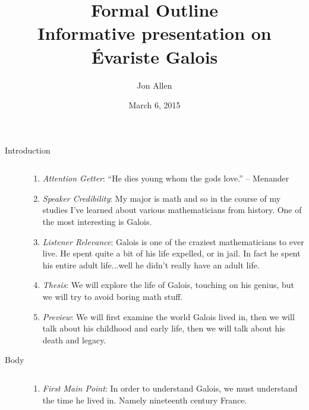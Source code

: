 \documentclass[letterpaper]{article}
\begin{document}
\title{Formal Outline\\ Informative presentation on Évariste Galois}
\date{March 6, 2015}
\author{Jon Allen}
\maketitle
\renewcommand{\labelenumi}{\Roman{enumi}}
\renewcommand{\labelenumii}{\Alph{enumii}.}

\begin{description}
\item[Introduction]$\quad$

  \begin{enumerate}
  \item
  \emph{Attention Getter}: ``He dies young whom the gods love.'' -- Menander
  \item
  \emph{Speaker Credibility}:
  My major is math and so in the course of my studies I've learned about various mathematicians from history. One of the most interesting is Galois.
  \item
  \emph{Listener Relevance}:
  Galois is one of the craziest mathematicians to ever live. He spent quite a bit of his life expelled, or in jail. In fact he spent his entire adult life...well he didn't really have an adult life.
  \item
  \emph{Thesis}:
  We will explore the life of Galois, touching on his genius, but we will try to avoid boring math stuff.
  \item
  \emph{Preview}:
  We will first examine the world Galois lived in, then we will talk about his childhood and early life, then we will talk about his death and legacy.
  \end{enumerate}
\item[Body]$\quad$

\begin{enumerate}
  \item
  \emph{First Main Point}: In order to understand Galois, we must understand the time he lived in. Namely nineteenth century France.


\end{enumerate}
\end{description}
\end{document}
